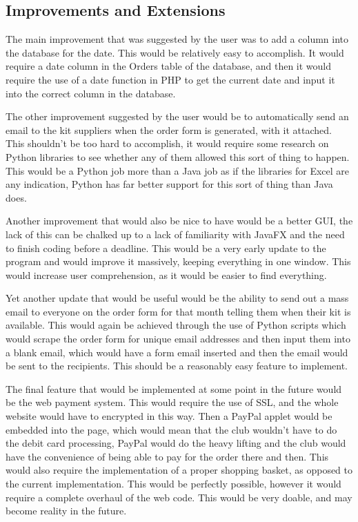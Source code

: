\documentclass[
11pt, %
a4paper, %
oneside, %
headinclude,footinclude, %
BCOR5mm, %
]{scrartcl}
\begin{document}
\subsection{Improvements and Extensions}
	The main improvement that was suggested by the user was to add a column into the database for the date. This would be relatively easy to accomplish. It would require a date column in the Orders table of the database, and then it would require the use of a date function in PHP to get the current date and input it into the correct column in the database. \par The other improvement suggested by the user would be to automatically send an email to the kit suppliers when the order form is generated, with it attached. This shouldn't be too hard to accomplish, it would require some research on Python libraries to see whether any of them allowed this sort of thing to happen. This would be a Python job more than a Java job as if the libraries for Excel are any indication, Python has far better support for this sort of thing than Java does. \par Another improvement that would also be nice to have would be a better GUI, the lack of this can be chalked up to a lack of familiarity with JavaFX and the need to finish coding before a deadline. This would be a very early update to the program and would improve it massively, keeping everything in one window. This would increase user comprehension, as it would be easier to find everything. \par Yet another update that would be useful would be the ability to send out a mass email to everyone on the order form for that month telling them when their kit is available. This would again be achieved through the use of Python scripts which would scrape the order form for unique email addresses and then input them into a blank email, which would have a form email inserted and then the email would be sent to the recipients. This should be a reasonably easy feature to implement. \par The final feature that would be implemented at some point in the future would be the web payment system. This would require the use of SSL, and the whole website would have to encrypted in this way. Then a PayPal applet would be embedded into the page, which would mean that the club wouldn't have to do the debit card processing, PayPal would do the heavy lifting and the club would have the convenience of being able to pay for the order there and then. This would also require the implementation of a proper shopping basket, as opposed to the current implementation. This would be perfectly possible, however it would require a complete overhaul of the web code. This would be very doable, and may become reality in the future. 
\end{document}

